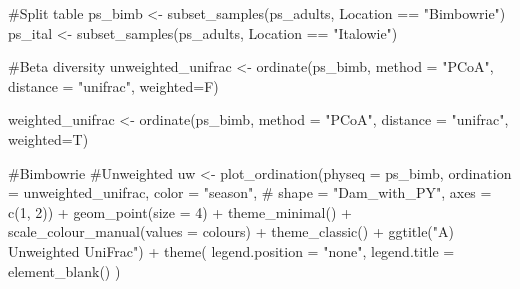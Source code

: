 \documentclass[
  letterpaper,
  DIV=11,
  numbers=noendperiod]{scrartcl}
\newenvironment{Shaded}{\begin{snugshade}}{\end{snugshade}}
\newcommand{\AttributeTok}[1]{\textcolor[rgb]{0.40,0.45,0.13}{#1}}
\newcommand{\CommentTok}[1]{\textcolor[rgb]{0.37,0.37,0.37}{#1}}
\newcommand{\DecValTok}[1]{\textcolor[rgb]{0.68,0.00,0.00}{#1}}
\newcommand{\FunctionTok}[1]{\textcolor[rgb]{0.28,0.35,0.67}{#1}}
\newcommand{\NormalTok}[1]{\textcolor[rgb]{0.00,0.23,0.31}{#1}}
\newcommand{\OtherTok}[1]{\textcolor[rgb]{0.00,0.23,0.31}{#1}}
\newcommand{\SpecialCharTok}[1]{\textcolor[rgb]{0.37,0.37,0.37}{#1}}
\newcommand{\StringTok}[1]{\textcolor[rgb]{0.13,0.47,0.30}{#1}}
\begin{document}
\begin{Shaded}
\begin{Highlighting}[]
\CommentTok{\#Split table}
\NormalTok{ps\_bimb }\OtherTok{\textless{}{-}} \FunctionTok{subset\_samples}\NormalTok{(ps\_adults, Location }\SpecialCharTok{==} \StringTok{"Bimbowrie"}\NormalTok{)}
\NormalTok{ps\_ital }\OtherTok{\textless{}{-}} \FunctionTok{subset\_samples}\NormalTok{(ps\_adults, Location }\SpecialCharTok{==} \StringTok{"Italowie"}\NormalTok{)}

\CommentTok{\#Beta diversity}
\NormalTok{unweighted\_unifrac }\OtherTok{\textless{}{-}} \FunctionTok{ordinate}\NormalTok{(ps\_bimb, }
                               \AttributeTok{method =} \StringTok{"PCoA"}\NormalTok{, }
                               \AttributeTok{distance =} \StringTok{"unifrac"}\NormalTok{, }\AttributeTok{weighted=}\NormalTok{F)}

\NormalTok{weighted\_unifrac }\OtherTok{\textless{}{-}} \FunctionTok{ordinate}\NormalTok{(ps\_bimb, }
                               \AttributeTok{method =} \StringTok{"PCoA"}\NormalTok{, }
                               \AttributeTok{distance =} \StringTok{"unifrac"}\NormalTok{, }\AttributeTok{weighted=}\NormalTok{T)}

\CommentTok{\#Bimbowrie}
\CommentTok{\#Unweighted}
\NormalTok{uw }\OtherTok{\textless{}{-}} \FunctionTok{plot\_ordination}\NormalTok{(}\AttributeTok{physeq =}\NormalTok{ ps\_bimb,}
                \AttributeTok{ordination =}\NormalTok{ unweighted\_unifrac,}
                \AttributeTok{color =} \StringTok{"season"}\NormalTok{,}
\CommentTok{\#                shape = "Dam\_with\_PY",}
                \AttributeTok{axes =} \FunctionTok{c}\NormalTok{(}\DecValTok{1}\NormalTok{, }\DecValTok{2}\NormalTok{)) }\SpecialCharTok{+}
  \FunctionTok{geom\_point}\NormalTok{(}\AttributeTok{size =} \DecValTok{4}\NormalTok{) }\SpecialCharTok{+}
  \FunctionTok{theme\_minimal}\NormalTok{() }\SpecialCharTok{+}
  \FunctionTok{scale\_colour\_manual}\NormalTok{(}\AttributeTok{values =}\NormalTok{ colours) }\SpecialCharTok{+}
  \FunctionTok{theme\_classic}\NormalTok{() }\SpecialCharTok{+}
  \FunctionTok{ggtitle}\NormalTok{(}\StringTok{"A) Unweighted UniFrac"}\NormalTok{) }\SpecialCharTok{+}
  \FunctionTok{theme}\NormalTok{(}
    \AttributeTok{legend.position =} \StringTok{"none"}\NormalTok{,}
    \AttributeTok{legend.title =} \FunctionTok{element\_blank}\NormalTok{()}
\NormalTok{    ) }


\end{Highlighting}
\end{Shaded}
\end{document}
